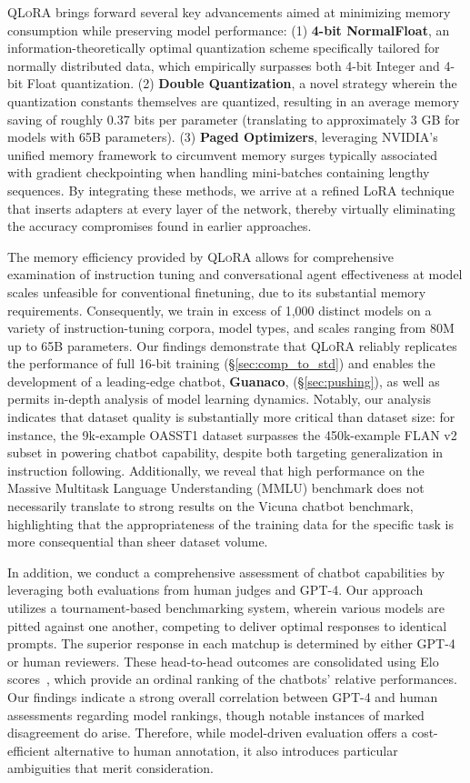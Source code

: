 \textsc{QLoRA} brings forward several key advancements aimed at minimizing memory consumption while preserving model performance: (1) \textbf{4-bit NormalFloat}, an information-theoretically optimal quantization scheme specifically tailored for normally distributed data, which empirically surpasses both 4-bit Integer and 4-bit Float quantization. (2) \textbf{Double Quantization}, a novel strategy wherein the quantization constants themselves are quantized, resulting in an average memory saving of roughly 0.37 bits per parameter (translating to approximately 3 GB for models with 65B parameters). (3) \textbf{Paged Optimizers}, leveraging NVIDIA’s unified memory framework to circumvent memory surges typically associated with gradient checkpointing when handling mini-batches containing lengthy sequences. By integrating these methods, we arrive at a refined LoRA technique that inserts adapters at every layer of the network, thereby virtually eliminating the accuracy compromises found in earlier approaches.

The memory efficiency provided by \textsc{QLoRA} allows for comprehensive examination of instruction tuning and conversational agent effectiveness at model scales unfeasible for conventional finetuning, due to its substantial memory requirements. Consequently, we train in excess of 1,000 distinct models on a variety of instruction-tuning corpora, model types, and scales ranging from 80M up to 65B parameters. Our findings demonstrate that \textsc{QLoRA} reliably replicates the performance of full 16-bit training (\S\ref{sec:comp_to_std}) and enables the development of a leading-edge chatbot, \textbf{Guanaco}, (\S\ref{sec:pushing}), as well as permits in-depth analysis of model learning dynamics. Notably, our analysis indicates that dataset quality is substantially more critical than dataset size: for instance, the 9k-example OASST1 dataset surpasses the 450k-example FLAN v2 subset in powering chatbot capability, despite both targeting generalization in instruction following. Additionally, we reveal that high performance on the Massive Multitask Language Understanding (MMLU) benchmark does not necessarily translate to strong results on the Vicuna chatbot benchmark, highlighting that the appropriateness of the training data for the specific task is more consequential than sheer dataset volume.

In addition, we conduct a comprehensive assessment of chatbot capabilities by leveraging both evaluations from human judges and GPT-4. Our approach utilizes a tournament-based benchmarking system, wherein various models are pitted against one another, competing to deliver optimal responses to identical prompts. The superior response in each matchup is determined by either GPT-4 or human reviewers. These head-to-head outcomes are consolidated using Elo scores~\citep{elo1967proposed, elo1978rating}, which provide an ordinal ranking of the chatbots' relative performances. Our findings indicate a strong overall correlation between GPT-4 and human assessments regarding model rankings, though notable instances of marked disagreement do arise. Therefore, while model-driven evaluation offers a cost-efficient alternative to human annotation, it also introduces particular ambiguities that merit consideration.

